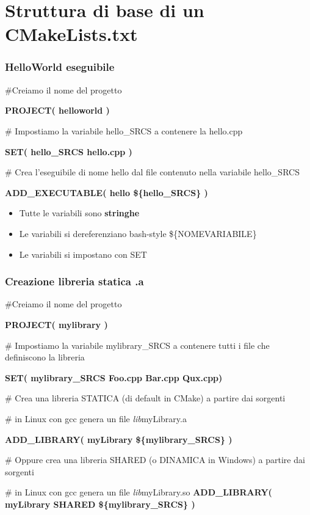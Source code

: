\documentclass[12pt] {beamer}
\begin{document}
\section{Struttura di base di un CMakeLists.txt}

\begin{frame}
	\frametitle{HelloWorld eseguibile}
\begin{small}
\#Creiamo il nome del progetto

\textbf{PROJECT( helloworld )}

\# Impostiamo la variabile hello\_SRCS a contenere la hello.cpp

\textbf{SET( hello\_SRCS hello.cpp )}

\# Crea l'eseguibile di nome hello dal file contenuto nella variabile hello\_SRCS

\textbf{ADD\_EXECUTABLE( hello \$\{hello\_SRCS\} )}

\begin{itemize}
	\item Tutte le variabili sono \textbf{stringhe}
	\item Le variabili si dereferenziano bash-style \$\{NOMEVARIABILE\}
	\item Le variabili si impostano con SET
\end{itemize}
\end{small}
\end{frame}


\begin{frame}
	\frametitle{Creazione libreria statica .a}
\begin{small}
\#Creiamo il nome del progetto

\textbf{PROJECT( mylibrary )}

\# Impostiamo la variabile mylibrary\_SRCS a contenere tutti i file che definiscono la libreria

\textbf{SET( mylibrary\_SRCS Foo.cpp Bar.cpp Qux.cpp)}

\# Crea una libreria STATICA (di default in CMake) a partire dai sorgenti

\# in Linux con gcc genera un file \emph{lib}myLibrary.a

\textbf{ADD\_LIBRARY( myLibrary \$\{mylibrary\_SRCS\} )}

\# Oppure crea una libreria SHARED (o DINAMICA in Windows) a partire dai sorgenti

\# in Linux con gcc genera un file \emph{lib}myLibrary.so
\textbf{ADD\_LIBRARY( myLibrary SHARED \$\{mylibrary\_SRCS\} )}
\end{small}
\end{frame}
\end{document}

